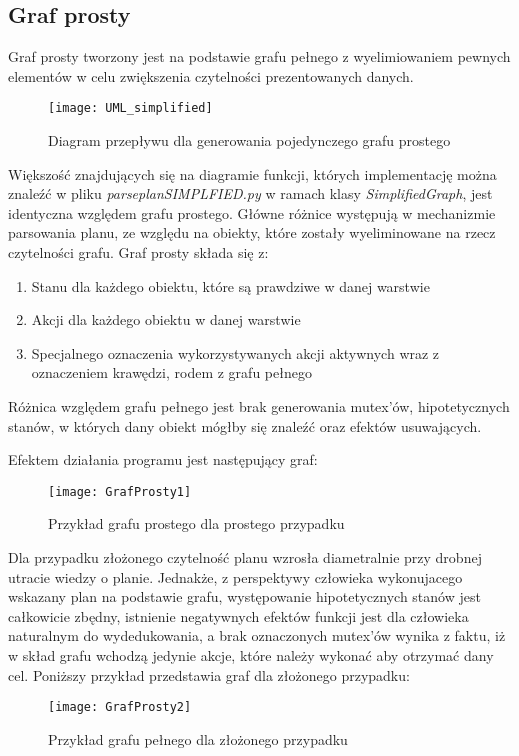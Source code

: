     \subsection{Graf prosty}

    Graf prosty tworzony jest na podstawie grafu pełnego z wyelimiowaniem pewnych elementów w celu zwiększenia czytelności prezentowanych danych.
    \begin{figure}[H]
        \texttt{[image: UML\_simplified]}
        \centering
        \caption{Diagram przepływu dla generowania pojedynczego grafu prostego}
    \end{figure}
    Większość znajdujących się na diagramie funkcji, których implementację można znaleźć w pliku \textit{parseplanSIMPLFIED.py} w ramach klasy 
    \textit{SimplifiedGraph}, jest identyczna względem grafu prostego. Główne różnice występują w mechanizmie parsowania planu, ze względu na obiekty, 
    które zostały wyeliminowane na rzecz czytelności grafu. Graf prosty składa się z:
    \begin{enumerate}
        \item Stanu dla każdego obiektu, które są prawdziwe w danej warstwie
        \item Akcji dla każdego obiektu w danej warstwie
        \item Specjalnego oznaczenia wykorzystywanych akcji aktywnych wraz z oznaczeniem krawędzi, rodem z grafu pełnego
    \end{enumerate}
    Różnica względem grafu pełnego jest brak generowania mutex'ów, hipotetycznych stanów, w których dany obiekt mógłby się znaleźć oraz efektów usuwających.
    
    Efektem działania programu jest następujący graf:
    \begin{figure}[H]
        \texttt{[image: GrafProsty1]}
        \centering
        \caption{Przykład grafu prostego dla prostego przypadku}
    \end{figure}
    Dla przypadku złożonego czytelność planu wzrosła diametralnie przy drobnej utracie wiedzy o planie. Jednakże, z perspektywy człowieka wykonujacego 
    wskazany plan na podstawie grafu, występowanie hipotetycznych stanów jest całkowicie zbędny, istnienie negatywnych efektów funkcji jest dla 
    człowieka naturalnym do wydedukowania, a brak oznaczonych mutex'ów wynika z faktu, iż w skład grafu wchodzą jedynie akcje, 
    które należy wykonać aby otrzymać dany cel. Poniższy przykład przedstawia graf dla złożonego przypadku:
    \begin{figure}[H]
        \texttt{[image: GrafProsty2]}
        \centering
        \caption{Przykład grafu pełnego dla złożonego przypadku}
    \end{figure}

